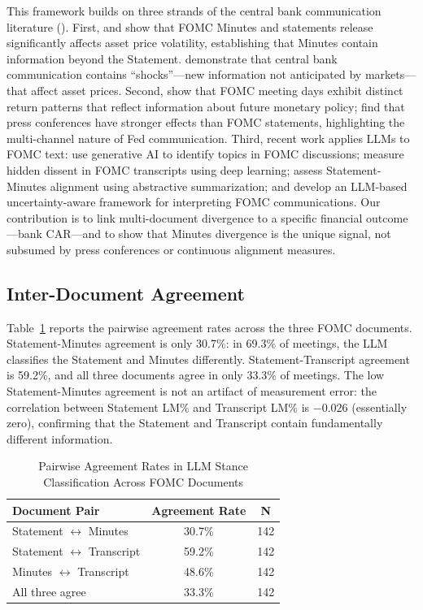 \documentclass[12pt,a4paper]{article}
\begin{document}
This framework builds on three strands of the central bank communication literature (\citet{Blinder2008}). First, \citet{Gurkaynak2005} and \citet{Rosa2013} show that FOMC Minutes and statements release significantly affects asset price volatility, establishing that Minutes contain information beyond the Statement. \citet{Hansen2016, Hansen2018} demonstrate that central bank communication contains ``shocks''---new information not anticipated by markets---that affect asset prices. Second, \citet{Cieslak2019} show that FOMC meeting days exhibit distinct return patterns that reflect information about future monetary policy; \citet{Bauer2025} find that press conferences have stronger effects than FOMC statements, highlighting the multi-channel nature of Fed communication. Third, recent work applies LLMs to FOMC text: \citet{Fed2024c} use generative AI to identify topics in FOMC discussions; \citet{Chen2025b} measure hidden dissent in FOMC transcripts using deep learning; \citet{Li2025} assess Statement-Minutes alignment using abstractive summarization; and \citet{Wang2025} develop an LLM-based uncertainty-aware framework for interpreting FOMC communications. Our contribution is to link multi-document divergence to a specific financial outcome---bank CAR---and to show that Minutes divergence is the unique signal, not subsumed by press conferences or continuous alignment measures.

\subsection{Inter-Document Agreement}

Table~\ref{tab:agreement} reports the pairwise agreement rates across the three FOMC documents. Statement-Minutes agreement is only 30.7\%: in 69.3\% of meetings, the LLM classifies the Statement and Minutes differently. Statement-Transcript agreement is 59.2\%, and all three documents agree in only 33.3\% of meetings. The low Statement-Minutes agreement is not an artifact of measurement error: the correlation between Statement LM\% and Transcript LM\% is $-0.026$ (essentially zero), confirming that the Statement and Transcript contain fundamentally different information.

\begin{table}[H]
\centering
\caption{Pairwise Agreement Rates in LLM Stance Classification Across FOMC Documents}
\label{tab:agreement}
\small
\begin{tabular}{lcc}
\toprule
Document Pair & Agreement Rate & N \\
\midrule
Statement $\leftrightarrow$ Minutes & 30.7\% & 142 \\
Statement $\leftrightarrow$ Transcript & 59.2\% & 142 \\
Minutes $\leftrightarrow$ Transcript & 48.6\% & 142 \\
All three agree & 33.3\% & 142 \\
\bottomrule
\end{tabular}
\end{table}
\end{document}
